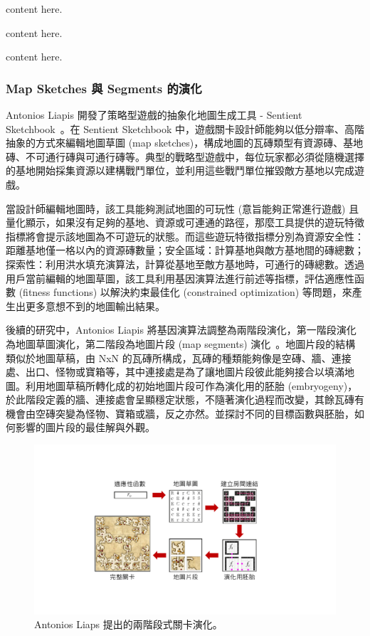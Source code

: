 content here.

content here.

content here.

\subsubsection{Map Sketches 與 Segments 的演化}
\label{sssec:relatedworks-proceduralgamepatterns-mapsketches}

Antonios Liapis 開發了策略型遊戲的抽象化地圖生成工具 - Sentient Sketchbook~\cite{liapis2013generating}。在 Sentient Sketchbook 中，遊戲關卡設計師能夠以低分辯率、高階抽象的方式來編輯地圖草圖 (map sketches)，構成地圖的瓦磚類型有資源磚、基地磚、不可通行磚與可通行磚等。典型的戰略型遊戲中，每位玩家都必須從隨機選擇的基地開始採集資源以建構戰鬥單位，並利用這些戰鬥單位摧毀敵方基地以完成遊戲。

當設計師編輯地圖時，該工具能夠測試地圖的可玩性 (意旨能夠正常進行遊戲) 且量化顯示，如果沒有足夠的基地、資源或可連通的路徑，那麼工具提供的遊玩特徵指標將會提示該地圖為不可遊玩的狀態。而這些遊玩特徵指標分別為資源安全性：距離基地僅一格以內的資源磚數量；安全區域：計算基地與敵方基地間的磚總數；探索性：利用洪水填充演算法，計算從基地至敵方基地時，可通行的磚總數。透過用戶當前編輯的地圖草圖，該工具利用基因演算法進行前述等指標，評估適應性函數 (fitness functions) 以解決約束最佳化 (constrained optimization) 等問題，來產生出更多意想不到的地圖輸出結果。

後續的研究中，Antonios Liapis 將基因演算法調整為兩階段演化，第一階段演化為地圖草圖演化，第二階段為地圖片段 (map segments) 演化~\cite{liapis2017multi}。地圖片段的結構類似於地圖草稿，由 NxN 的瓦磚所構成，瓦磚的種類能夠像是空磚、牆、連接處、出口、怪物或寶箱等，其中連接處是為了讓地圖片段彼此能夠接合以填滿地圖。利用地圖草稿所轉化成的初始地圖片段可作為演化用的胚胎 (embryogeny)，於此階段定義的牆、連接處會呈顯穩定狀態，不隨著演化過程而改變，其餘瓦磚有機會由空磚突變為怪物、寶箱或牆，反之亦然。並探討不同的目標函數與胚胎，如何影響的圖片段的最佳解與外觀。

\begin{figure}[h]
  \begin{center}
    \includegraphics[width=1.0\textwidth]{figures/Multi-segment演化框架.pdf}
    \caption{Antonios Liaps 提出的兩階段式關卡演化。} 
    \label{fig:multi-segment-evolution}
  \end{center}
\end{figure}

